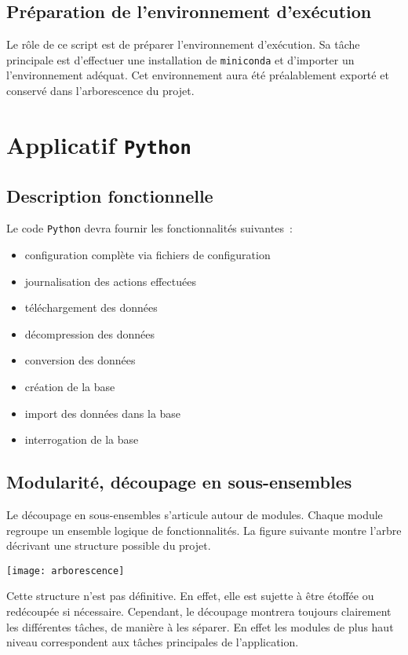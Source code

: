 \documentclass[french,12pt]{article}
\begin{document}
\subsection{Préparation de l'environnement d'exécution}

Le rôle de ce script est de préparer l'environnement d'exécution. Sa tâche principale est d'effectuer une installation de \texttt{miniconda} et d'importer un l'environnement adéquat. Cet environnement aura été préalablement exporté et conservé dans l'arborescence du projet.

\section{Applicatif \texttt{Python}}

\subsection{Description fonctionnelle}

Le code \texttt{Python} devra fournir les fonctionnalités suivantes~:

\begin{itemize}
  \item configuration complète via fichiers de configuration
  \item journalisation des actions effectuées
  \item téléchargement des données
  \item décompression des données
  \item conversion des données
  \item création de la base
  \item import des données dans la base
  \item interrogation de la base
\end{itemize}

\subsection{Modularité, découpage en sous-ensembles}

Le découpage en sous-ensembles s'articule autour de modules. Chaque module regroupe un ensemble logique de fonctionnalités. La figure suivante montre l'arbre décrivant une structure possible du projet.

\texttt{[image: arborescence]}

Cette structure n'est pas définitive. En effet, elle est sujette à être étoffée ou redécoupée si nécessaire. Cependant, le découpage montrera toujours clairement les différentes tâches, de manière à les séparer. En effet les modules de plus haut niveau correspondent aux tâches principales de l'application.

\end{document}
